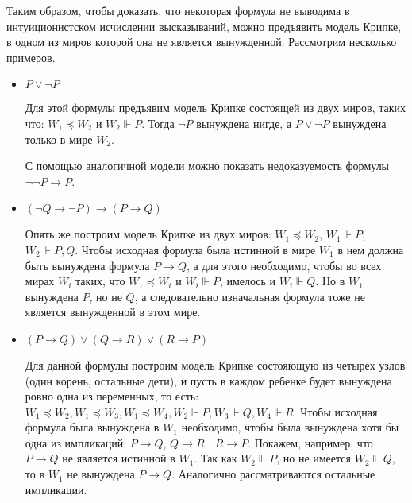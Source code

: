 Таким образом, чтобы доказать, что некоторая формула не выводима в 
интуиционистском исчислении высказываний, можно предъявить модель Крипке,
в одном из миров которой она не является вынужденной.
Рассмотрим несколько примеров.


\begin{itemize}

\item $P \vee\neg P$

Для этой формулы предъявим модель Крипке состоящей из двух миров, таких что:  
$W_1 \preceq W_2$ и $W_2 \Vdash P$. Тогда $\neg P$ вынуждена нигде, 
а $P \vee\neg P$ вынуждена только в мире $W_2$.


\begin{center} \end{center}

С помощью аналогичной модели можно показать недоказуемость 
формулы $\neg\neg P \rightarrow P$.

\item $(\neg Q \rightarrow \neg P) \rightarrow (P \rightarrow Q)$

Опять же построим модель Крипке из двух миров: 
$W_1 \preceq W_2$,  $W_1 \Vdash P$,  $W_2 \Vdash P, Q$. Чтобы исходная
формула была истинной в мире $W_1$ в нем должна быть вынуждена 
формула $P \rightarrow Q$, а для этого необходимо, чтобы во всех мирах
$W_i$ таких, что $W_1 \preceq W_i$ и $W_i \Vdash P$, имелось и $W_i \Vdash Q$.
Но в $W_1$  вынуждена $P$, но не  $Q$, а следовательно изначальная формула тоже
не является вынужденной в этом мире.

\begin{center} \end{center}

\item $(P \rightarrow Q) \vee (Q \rightarrow R) \vee (R \rightarrow P)$

Для данной формулы построим модель Крипке состояющую из четырех узлов (один корень, остальные дети), 
и пусть в каждом ребенке будет вынуждена ровно одна из переменных, то есть: 
$W_1 \preceq W_2, W_1 \preceq W_3, W_1 \preceq W_4, 
W_2 \Vdash P, W_3 \Vdash Q, W_4 \Vdash R$.  
Чтобы исходная формула была вынуждена в $W_1$ необходимо, чтобы была вынуждена хотя бы одна
из импликаций: $P \rightarrow Q$,  $Q \rightarrow R$ , $R \rightarrow P$. 
Покажем, например, что $P \rightarrow Q$ не является истинной в $W_1$. 
Так как $W_2 \Vdash P$, но не имеется $W_2 \Vdash Q$, то в $W_1$ не вынуждена $P \rightarrow Q$.
Аналогично рассматриваются остальные импликации.

\begin{center} \end{center}

\end{itemize}



